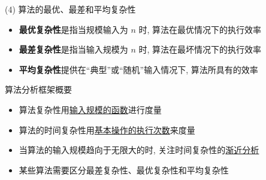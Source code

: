 \documentclass[fontset=fandol,UTF8,12pt,aspectratio=169,fleqn]{beamer}
\begin{document}

\begin{frame}{(4) 算法的最优、最差和平均复杂性}
\begin{itemize}[<+-|alert@+>]
\item \textbf{最优复杂性}是指当规模输入为 $n$ 时, 算法在最优情况下的执行效率  
\item \textbf{最差复杂性}是指当输入规模为 $n$ 时, 算法在最坏情况下的执行效率  
\item \textbf{平均复杂性}提供在``典型''或``随机''输入情况下, 算法所具有的效率  
\end{itemize}
\end{frame}

\begin{frame}{算法分析框架概要}
\begin{itemize}[<+-|alert@+>]
\item 算法复杂性用\underline{输入规模的函数}进行度量  
\item 算法的时间复杂性用\underline{基本操作的执行次数}来度量  
\item 当算法的输入规模趋向于无限大的时, 关注时间复杂性的\underline{渐近分析}  
\item 某些算法需要区分最差复杂性、最优复杂性和平均复杂性  
\end{itemize}
\end{frame}
\end{document}
